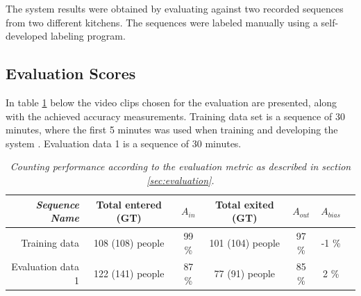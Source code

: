 The system results were obtained by evaluating against two recorded sequences from two different kitchens. The sequences were labeled manually using a self-developed labeling program.

\subsection{Evaluation Scores}
In table \ref{tab:evaluation_performance} below the video clips chosen for the evaluation are presented, along with the achieved accuracy measurements. Training data set is a sequence of 30 minutes, where the first 5 minutes was used when training and developing the system . Evaluation data 1 is a sequence of 30 minutes.

\begin{table}[h]
\centering
	\begin{tabular}{r | c | c | c | c | c | c }
		\emph{Sequence Name}		&  Total entered (GT) & \emph{$A_{in}$} & Total exited (GT) & \emph{$A_{out}$} & \emph{$A_{bias}$}\\
		\hline \hline
		Training data			& 108 (108) people & 99 \% & 101 (104) people & 97 \% & -1 \% \\
		Evaluation data 1		& 122 (141) people & 87 \% & 77 (91) people & 85 \% & 2 \% \\
		\end{tabular}
	\caption[System performance]{\textit{Counting performance according to the evaluation metric as described in section \ref{sec:evaluation}.}}
	\label{tab:evaluation_performance}
\end{table}


